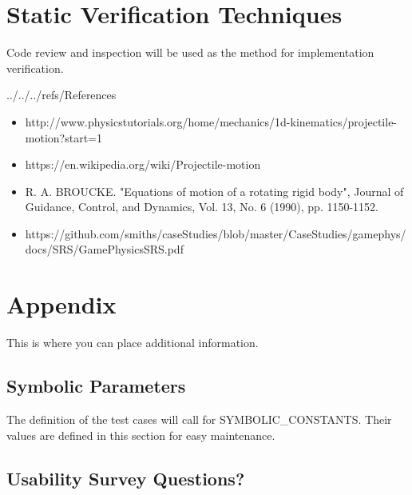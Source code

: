 \documentclass[12pt, titlepage]{article}
\begin{document}
\section{Static Verification Techniques}
Code review and inspection will be used as the method for implementation verification.
				


 {../../../refs/References}
\begin{itemize}
\item{http://www.physicstutorials.org/home/mechanics/1d-kinematics/projectile-motion?start=1}
\item{https://en.wikipedia.org/wiki/Projectile-motion}
\item{R. A. BROUCKE.  "Equations of motion of a rotating rigid body", Journal of Guidance, Control, and Dynamics, Vol. 13, No. 6 (1990), pp. 1150-1152.}
\item{https://github.com/smiths/caseStudies/blob/master/CaseStudies/gamephys/docs/SRS/GamePhysicsSRS.pdf}

\end{itemize}


\newpage

\section{Appendix}

This is where you can place additional information.

\subsection{Symbolic Parameters}

The definition of the test cases will call for SYMBOLIC\_CONSTANTS.
Their values are defined in this section for easy maintenance.

\subsection{Usability Survey Questions?}
\end{document}
